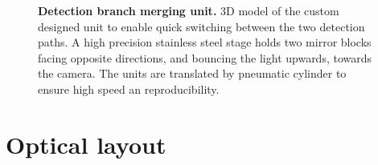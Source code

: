 \documentclass{diploma_style}
\begin{document}
\begin{figure}[htb]
\centering
\caption{\textbf{Detection branch merging unit.} 3D model of the custom designed unit to enable quick switching between the two detection paths. A high precision stainless steel stage holds two mirror blocks facing opposite directions, and bouncing the light upwards, towards the camera. The units are translated by  pneumatic cylinder to ensure high speed an reproducibility.}
\label{fig:DualMirror}
\end{figure}	


\section{Optical layout}
\end{document}
